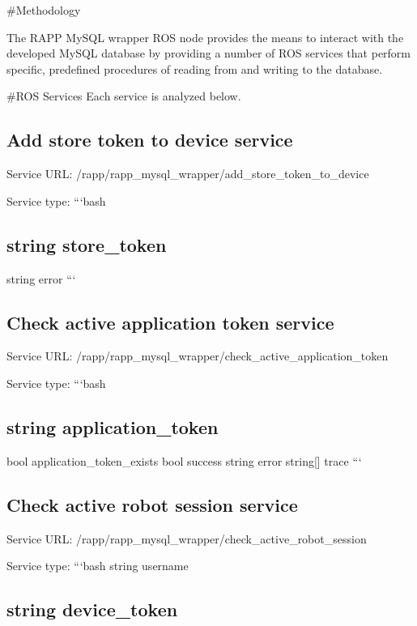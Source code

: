 \#\-Methodology

The R\-A\-P\-P My\-S\-Q\-L wrapper R\-O\-S node provides the means to interact with the developed My\-S\-Q\-L database by providing a number of R\-O\-S services that perform specific, predefined procedures of reading from and writing to the database.

\#\-R\-O\-S Services Each service is analyzed below.

\subsection*{Add store token to device service}

Service U\-R\-L\-: {\ttfamily /rapp/rapp\-\_\-mysql\-\_\-wrapper/add\-\_\-store\-\_\-token\-\_\-to\-\_\-device}

Service type\-: ```bash \subsection*{string store\-\_\-token }

string error ```

\subsection*{Check active application token service}

Service U\-R\-L\-: {\ttfamily /rapp/rapp\-\_\-mysql\-\_\-wrapper/check\-\_\-active\-\_\-application\-\_\-token}

Service type\-: ```bash \subsection*{string application\-\_\-token }

bool application\-\_\-token\-\_\-exists bool success string error string\mbox{[}\mbox{]} trace ```

\subsection*{Check active robot session service}

Service U\-R\-L\-: {\ttfamily /rapp/rapp\-\_\-mysql\-\_\-wrapper/check\-\_\-active\-\_\-robot\-\_\-session}

Service type\-: ```bash string username \subsection*{string device\-\_\-token }

